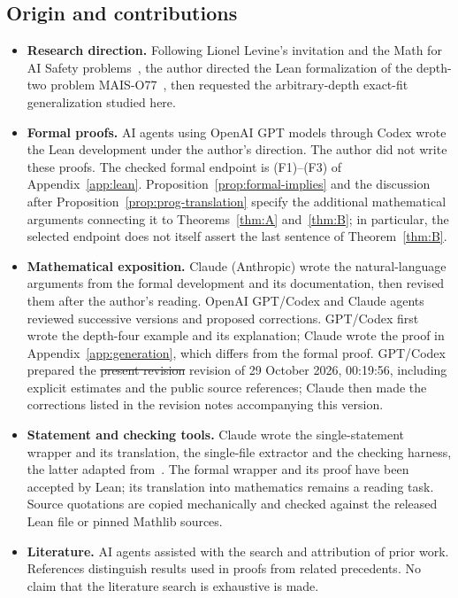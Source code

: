 \documentclass[11pt,a4paper]{article}
\theoremstyle{definition}
\theoremstyle{remark}
\numberwithin{equation}{section}
\providecommand{\DIFaddtex}[1]{{\protect\color{blue}#1}} %
\providecommand{\DIFdeltex}[1]{{\protect\color{red}\sout{#1}}} %
\providecommand{\DIFaddbegin}{} %
\providecommand{\DIFaddend}{} %
\providecommand{\DIFdelbegin}{} %
\providecommand{\DIFdelend}{} %
\providecommand{\DIFadd}[1]{\texorpdfstring{\DIFaddtex{#1}}{#1}} %
\providecommand{\DIFdel}[1]{\texorpdfstring{\DIFdeltex{#1}}{}} %
\begin{document}
\subsection*{Origin and contributions}
\begin{itemize}
\item \textbf{Research direction.} Following Lionel Levine's invitation and the Math for AI Safety problems~\cite{levine-mais,mais-repo}, the author directed the Lean formalization of the depth-two problem MAIS-O77~\cite{mais-o77,feld-o77}, then requested the arbitrary-depth exact-fit generalization studied here.
\item \textbf{Formal proofs.} AI agents using OpenAI GPT models through Codex wrote the Lean development under the author's direction. The author did not write these proofs. The checked formal endpoint is (F1)--(F3) of Appendix~\ref{app:lean}. Proposition~\ref{prop:formal-implies} and the discussion after Proposition~\ref{prop:prog-translation} specify the additional mathematical arguments connecting it to Theorems~\ref{thm:A} and~\ref{thm:B}; in particular, the selected endpoint does not itself assert the last sentence of Theorem~\ref{thm:B}.
\item \textbf{Mathematical exposition.} Claude (Anthropic) wrote the natural-language arguments from the formal development and its documentation, then revised them after the author's reading. OpenAI GPT/Codex and Claude agents reviewed successive versions and proposed corrections. GPT/Codex first wrote the depth-four example and its explanation; Claude wrote the proof in Appendix~\ref{app:generation}, which differs from the formal proof. GPT/Codex prepared the \DIFdelbegin \DIFdel{present revision }\DIFdelend \DIFaddbegin \DIFadd{revision of 29 October 2026, 00:19:56}\DIFaddend , including explicit estimates and the public source references\DIFaddbegin \DIFadd{; Claude then made the corrections listed in the revision notes accompanying this version}\DIFaddend .
\item \textbf{Statement and checking tools.} Claude wrote the single-statement wrapper and its translation, the single-file extractor and the checking harness, the latter adapted from~\cite{feld-o77}. The formal wrapper and its proof have been accepted by Lean; its translation into mathematics remains a reading task. Source quotations are copied mechanically and checked against the released Lean file or pinned Mathlib sources.
\item \textbf{Literature.} AI agents assisted with the search and attribution of prior work. References distinguish results used in proofs from related precedents. No claim that the literature search is exhaustive is made.
\end{itemize}
\end{document}

